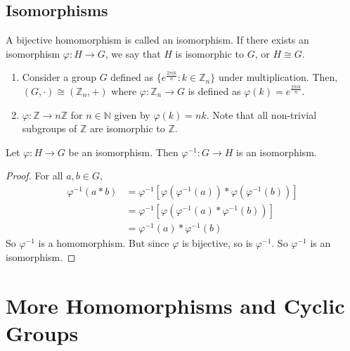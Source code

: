 \documentclass{article}
\begin{document}
\subsection{Isomorphisms}
A bijective homomorphism is called an isomorphism. If there exists an isomorphism $\varphi: H \to G$, we say that $H$ is isomorphic to $G$, or $H \cong G$.
\begin{enumerate}
	\item Consider a group $G$ defined as $\{ e^{\frac{2 \pi i k}{n}} : k \in \mathbb Z_n \}$ under multiplication. Then, $(G, \cdot) \cong (\mathbb Z_n, +)$ where $\varphi: \mathbb Z_n \to G$ is defined as $\varphi(k) = e^{\frac{2\pi i k}{n}}$.
	\item $\varphi: \mathbb Z \to n\mathbb Z$ for $n \in \mathbb N$ given by $\varphi(k) = nk$. Note that all non-trivial subgroups of $\mathbb Z$ are isomorphic to $\mathbb Z$.
\end{enumerate}

\begin{proposition}
	Let $\varphi: H \to G$ be an isomorphism. Then $\varphi^{-1}: G \to H$ is an isomorphism.
\end{proposition}
\begin{proof}
	For all $a, b \in G$,
	\begin{align*}
		\varphi^{-1}(a \ast b) & = \varphi^{-1}\left[ \varphi(\varphi^{-1}(a)) \ast \varphi(\varphi^{-1}(b)) \right] \\
		                       & = \varphi^{-1}\left[ \varphi(\varphi^{-1}(a) \ast \varphi^{-1}(b)) \right]          \\
		                       & = \varphi^{-1}(a) \ast \varphi^{-1}(b)
	\end{align*}
	So $\varphi^{-1}$ is a homomorphism. But since $\varphi$ is bijective, so is $\varphi^{-1}$. So $\varphi^{-1}$ is an isomorphism.
\end{proof}

\section{More Homomorphisms and Cyclic Groups}
\end{document}
